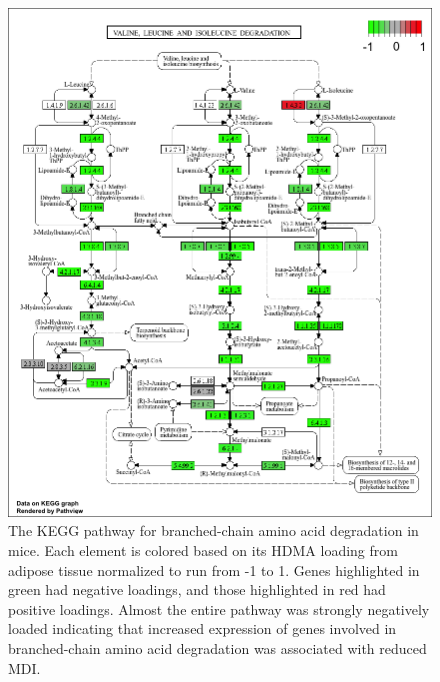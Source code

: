 \documentclass[
]{article}
\begin{document}
\begin{figure}[ht!]
\includegraphics[width=\textwidth]{Figures/Supp_Fig_Branched_Chain.png} 
\caption{The KEGG pathway for branched-chain amino acid degradation in 
mice. Each element is colored based on its HDMA loading from adipose
tissue normalized to run from -1 to 1. Genes highlighted in green had 
negative loadings, and those highlighted in red had positive loadings. 
Almost the entire pathway was strongly negatively loaded indicating 
that increased expression of genes involved in branched-chain amino acid 
degradation was associated with reduced MDI.
}
\label{fig:bcaa_degrataion}
\end{figure}
\end{document}
